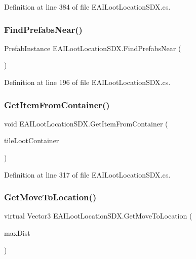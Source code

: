 Definition at line 384 of file E\+A\+I\+Loot\+Location\+S\+D\+X.\+cs.

\mbox{\label{class_e_a_i_loot_location_s_d_x_a797a04c2c771baa7785570beb13b39b7}} 
\subsubsection{\texorpdfstring{FindPrefabsNear()}{FindPrefabsNear()}}
{\footnotesize\ttfamily Prefab\+Instance E\+A\+I\+Loot\+Location\+S\+D\+X.\+Find\+Prefabs\+Near (\begin{DoxyParamCaption}{ }\end{DoxyParamCaption})}



Definition at line 196 of file E\+A\+I\+Loot\+Location\+S\+D\+X.\+cs.

\mbox{\label{class_e_a_i_loot_location_s_d_x_ab5d1353e4de2709ae5c3ea8997df4df6}} 
\subsubsection{\texorpdfstring{GetItemFromContainer()}{GetItemFromContainer()}}
{\footnotesize\ttfamily void E\+A\+I\+Loot\+Location\+S\+D\+X.\+Get\+Item\+From\+Container (\begin{DoxyParamCaption}\item[{Tile\+Entity\+Loot\+Container}]{tile\+Loot\+Container }\end{DoxyParamCaption})}



Definition at line 317 of file E\+A\+I\+Loot\+Location\+S\+D\+X.\+cs.

\mbox{\label{class_e_a_i_loot_location_s_d_x_a0ae79f6b08ae9a0f467f06c6e160f50e}} 
\subsubsection{\texorpdfstring{GetMoveToLocation()}{GetMoveToLocation()}}
{\footnotesize\ttfamily virtual Vector3 E\+A\+I\+Loot\+Location\+S\+D\+X.\+Get\+Move\+To\+Location (\begin{DoxyParamCaption}\item[{float}]{max\+Dist }\end{DoxyParamCaption})\hspace{0.3cm}{\ttfamily [virtual]}}



